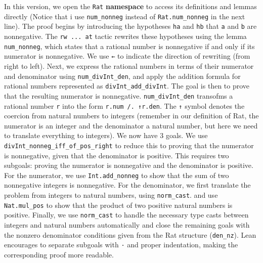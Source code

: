 \begin{example}
In this version, we open the 
\lstinline[language=lean]|Rat| \textbf{namespace} to access its definitions and lemmas directly 
(Notice that i use \lstinline[language=lean]|num_nonneg| instead of 
\lstinline[language=lean]|Rat.num_nonneg| in the next line).
The proof begins by introducing the hypotheses \lstinline[language=lean]|ha| and \lstinline[language=lean]|hb|
that \lstinline[language=lean]|a| and \lstinline[language=lean]|b| are nonnegative.
The \lstinline[language=lean]|rw ... at| tactic rewrites these hypotheses using the lemma
\lstinline[language=lean]|num_nonneg|, which states that a rational number
is nonnegative if and only if its numerator is nonnegative. 
We use \lstinline[language=lean]|←| to indicate the direction of rewriting (from right to left).
Next, we express the rational numbers in terms of their numerator and denominator using
\lstinline[language=lean]|num_divInt_den|, and apply the addition formula
for rational numbers represented as \lstinline[language=lean]|divInt_add_divInt|.
The goal is then to prove that the resulting numerator is nonnegative.
\lstinline[language=lean]|num_divInt_den| transofms a rational number \lstinline[language=lean]|r| 
into the form \lstinline[language=lean]|r.num /. ↑r.den|. The \lstinline[language=lean]|↑| symbol denotes
the coercion from natural numbers to integers 
(remember in our definition of Rat, the numerator is an integer and the denominator a natural number, 
but here we need to translate everything to integers). 
We now have 3 goals.
We use \lstinline[language=lean]|divInt_nonneg_iff_of_pos_right| to reduce this to proving that the 
numerator is nonnegative, given that the denominator is positive.
This requires two subgoals: proving the numerator is nonnegative and the denominator is positive.
For the numerator, we use \lstinline[language=lean]|Int.add_nonneg|
to show that the sum of two nonnegative integers is nonnegative.
For the denominator, we first translate the problem from integers to natural numbers, using \lstinline[language=lean]|norm_cast|.
and use \lstinline[language=lean]|Nat.mul_pos| to show that the product of two positive natural numbers is positive.
Finally, we use \lstinline[language=lean]|norm_cast| to handle the necessary type casts between integers 
and natural numbers automatically and close the remaining goals with the 
nonzero denominator conditions given from the Rat structure (\lstinline[language=lean]|den_nz|).
Lean encourages to separate subgoals with \lstinline[language=lean]|·| and proper indentation, 
making the corresponding proof more readable.
\end{example}

